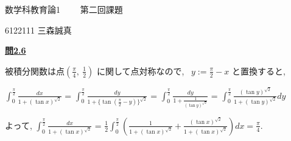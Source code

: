 \documentclass{jsarticle}
\begin{document}
\begin{center}
  数学科教育論1 \ \ \ \ 第二回課題
\end{center}

\begin{flushright}
  6122111 三森誠真
\end{flushright}
\underline{\textbf{問2.6}}

被積分関数は点$\left(\displaystyle \frac{\pi}{4}, \ \frac{1}{2} \right)$ に関して点対称なので, \ $y:= \displaystyle \frac{\pi}{2} - x$ と置換すると, 

$\displaystyle \int_0^\frac{\pi}{2} \frac{dx}{1+(\tan x)^{\sqrt{2}}}$
= $\displaystyle \int_0^\frac{\pi}{2} \frac{dy}{1+\{\tan (\frac{\pi}{2} - y) \}^{\sqrt{2}}}$
= $\displaystyle \int_0^\frac{\pi}{2} \frac{dy}{1+\frac{1}{(\tan y)^{\sqrt{2}}}}$
= $\displaystyle \int_0^{\frac{\pi}{2}} \frac{(\tan y)^{\sqrt{2}}}{1+(\tan y)^{\sqrt{2}}} dy$

よって, $\displaystyle \int_0^\frac{\pi}{2} \frac{dx}{1+(\tan x)^{\sqrt{2}}}$
= $\displaystyle \frac{1}{2} \int_0^\frac{\pi}{2} \left(\frac{1}{1+(\tan x)^{\sqrt{2}}} + \frac{(\tan x)^{\sqrt{2}}}{1+(\tan x)^{\sqrt{2}}} \right) dx = \displaystyle \frac{\pi}{4}$.
\end{document}

